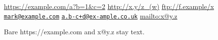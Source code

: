\url{https://example.com/a?b=1&c=2} \url{http://x.y/z_(w)}
\url{ftp://f.example/x}
\href{mailto:mark@example.com}{\nolinkurl{mark@example.com}}
\href{mailto:a.b-c+d@ex-ample.co.uk}{\nolinkurl{a.b-c+d@ex-ample.co.uk}}
\url{mailto:x@y.z}

Bare https://example.com and x@y.z stay text.
